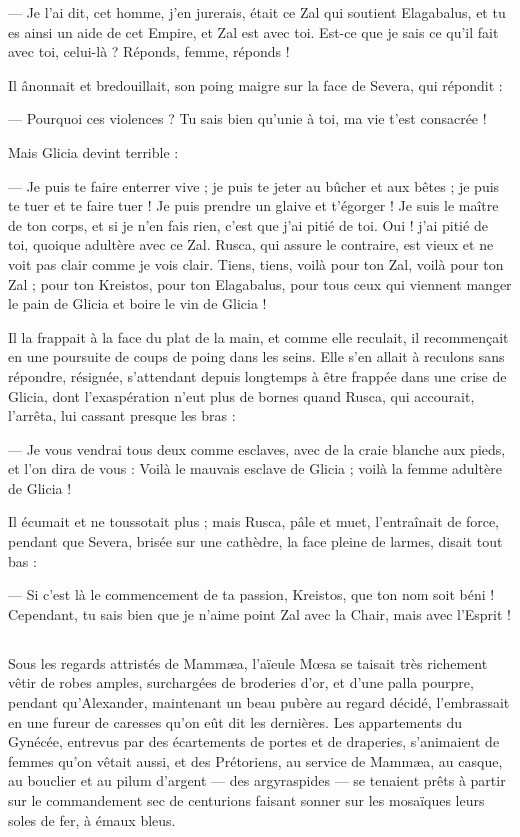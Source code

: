\documentclass[a4paper, 11pt, oneside, polutonikogreek, french]{article}
\begin{document}
--- Je l'ai dit, cet homme, j'en jurerais, était ce Zal qui soutient Elagabalus, et tu es ainsi un aide de cet Empire, et Zal est avec toi. Est-ce que je sais ce qu'il fait avec toi, celui-là ? Réponds, femme, réponds !

Il ânonnait et bredouillait, son poing maigre sur la face de Severa, qui répondit :

--- Pourquoi ces violences ? Tu sais bien qu'unie à toi, ma vie t'est consacrée !

Mais Glicia devint terrible :

--- Je puis te faire enterrer vive ; je puis te jeter au bûcher et aux bêtes ; je puis te tuer et te faire tuer ! Je puis prendre un glaive et t'égorger ! Je suis le maître de ton corps, et si je n'en fais rien, c'est que j'ai pitié de toi. Oui ! j'ai pitié de toi, quoique adultère avec ce Zal. Rusca, qui assure le contraire, est vieux et ne voit pas clair comme je vois clair. Tiens, tiens, voilà pour ton Zal, voilà pour ton Zal ; pour ton Kreistos, pour ton Elagabalus, pour tous ceux qui viennent manger le pain de Glicia et boire le vin de Glicia !

Il la frappait à la face du plat de la main, et comme elle reculait, il recommençait en une poursuite de coups de poing dans les seins. Elle s'en allait à reculons sans répondre, résignée, s'attendant depuis longtemps à être frappée dans une crise de Glicia, dont l'exaspération n'eut plus de bornes quand Rusca, qui accourait, l'arrêta, lui cassant presque les bras :

--- Je vous vendrai tous deux comme esclaves, avec de la craie blanche aux pieds, et l'on dira de vous : Voilà le mauvais esclave de Glicia ; voilà la femme adultère de Glicia !

Il écumait et ne toussotait plus ; mais Rusca, pâle et muet, l'entraînait de force, pendant que Severa, brisée sur une cathèdre, la face pleine de larmes, disait tout bas :

--- Si c'est là le commencement de ta passion, Kreistos, que ton nom soit béni ! Cependant, tu sais bien que je n'aime point Zal avec la Chair, mais avec l'Esprit !
\clearpage
\subsection{}
\paragraph{}
Sous les regards attristés de Mammæa, l'aïeule Mœsa se taisait très richement vêtir de robes amples, surchargées de broderies d'or, et d'une palla pourpre, pendant qu'Alexander, maintenant un beau pubère au regard décidé, l'embrassait en une fureur de caresses qu'on eût dit les dernières. Les appartements du Gynécée, entrevus par des écartements de portes et de draperies, s'animaient de femmes qu'on vêtait aussi, et des Prétoriens, au service de Mammæa, au casque, au bouclier et au pilum d'argent --- des argyraspides --- se tenaient prêts à partir sur le commandement sec de centurions faisant sonner sur les mosaïques leurs soles de fer, à émaux bleus.
\end{document}
